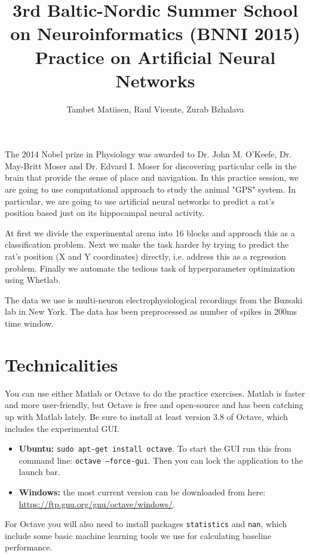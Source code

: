 \documentclass[a4paper,11pt]{article}
\author{\large{Tambet Matiisen, Raul Vicente, Zurab Bzhalava}}
\title{\huge{3rd Baltic-Nordic Summer School on Neuroinformatics (BNNI 2015)}\\\LARGE{Practice on Artificial Neural Networks}}
\begin{document}
\maketitle

%
%
The 2014 Nobel prize in Physiology was awarded to Dr. John M. O'Keefe, Dr. May-Britt Moser and Dr. Edvard I. Moser for discovering particular cells in the brain that provide the sense of place and navigation. In this practice session, we are going to use computational approach to study the animal "GPS" system. In particular, we are going to use artificial neural networks to predict a rat's position based just on its hippocampal neural activity.

At first we divide the experimental arena into 16 blocks and approach this as a classification problem. Next we make the task harder by trying to predict the rat's position (X and Y coordinates) directly, i.e. address this as a regression problem. Finally we automate the tedious task of hyperparameter optimization using Whetlab. 

The data we use is multi-neuron electrophysiological recordings from the Buzsaki lab in New York. The data has been preprocessed as number of spikes in 200ms time window.

%
%
\section{Technicalities}

You can use either Matlab or Octave to do the practice exercises. Matlab is faster and more user-friendly, but Octave is free and open-source and has been catching up with Matlab lately. Be sure to install at least version 3.8 of Octave, which includes the experimental GUI.
\begin{itemize}
	\item \textbf{Ubuntu:} \texttt{sudo apt-get install octave}. To start the GUI run this from command line: \texttt{octave --force-gui}. Then you can lock the application to the launch bar. 
	\item \textbf{Windows:} the most current version can be downloaded from here:\\ \url{https://ftp.gnu.org/gnu/octave/windows/}.
\end{itemize}

For Octave you will also need to install packages \texttt{statistics} and \texttt{nan}, which include some basic machine learning tools we use for calculating baseline performance. 
\end{document}
